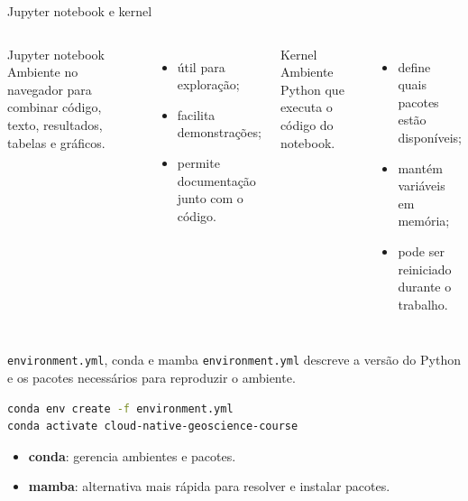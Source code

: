 \documentclass[aspectratio=169]{beamer}
\begin{document}
\begin{frame}{Jupyter notebook e kernel}
\begin{columns}
\begin{block}{Jupyter notebook}
Ambiente no navegador para combinar código, texto, resultados, tabelas e gráficos.
\end{block}

\begin{itemize}
  \item útil para exploração;
  \item facilita demonstrações;
  \item permite documentação junto com o código.
\end{itemize}

\begin{block}{Kernel}
Ambiente Python que executa o código do notebook.
\end{block}

\begin{itemize}
  \item define quais pacotes estão disponíveis;
  \item mantém variáveis em memória;
  \item pode ser reiniciado durante o trabalho.
\end{itemize}
\end{columns}
\end{frame}

\begin{frame}[fragile]{\texttt{environment.yml}, conda e mamba}
\texttt{environment.yml} descreve a versão do Python e os pacotes necessários para reproduzir o ambiente.

\vspace{0.3cm}

\begin{lstlisting}[language=bash]
conda env create -f environment.yml
conda activate cloud-native-geoscience-course
\end{lstlisting}

\vspace{0.3cm}

\begin{itemize}
  \item \textbf{conda}: gerencia ambientes e pacotes.
  \item \textbf{mamba}: alternativa mais rápida para resolver e instalar pacotes.
\end{itemize}
\end{frame}
\end{document}
